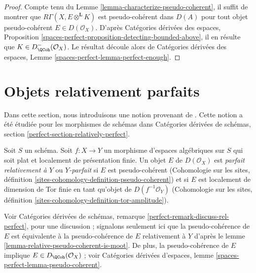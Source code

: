 \begin{proof}
Compte tenu du Lemme \ref{lemma-characterize-pseudo-coherent}, il suffit
de montrer que $R \Gamma (X, E \otimes ^{\mathbf{L}} K)$ est
pseudo-cohérent dans $D(A)$ pour tout objet pseudo-cohérent
$E \in D(\mathcal{O}_X)$. D'après Catégories dérivées des espaces,
Proposition \ref{spaces-perfect-proposition-detecting-bounded-above},
il en résulte que $K \in D^-_\QCoh (\mathcal{O}_X)$. Le
résultat découle alors de Catégories dérivées des espaces, Lemme
\ref{spaces-perfect-lemma-perfect-enough}.
\end{proof}












\section{Objets relativement parfaits}
\label{section-relatively-perfect}

\noindent
Dans cette section, nous introduisons une notion provenant de \cite{lieblich-complexes}.
Cette notion a été étudiée pour les morphismes de schémas dans
Catégories dérivées de schémas, section
\ref{perfect-section-relatively-perfect}.

\begin{definition}
\label{definition-relatively-perfect}
Soit $S$ un schéma. Soit $f : X \to Y$ un morphisme d'espaces algébriques
sur $S$ qui soit plat et localement de présentation finie.
Un objet $E$ de $D(\mathcal{O}_X)$ est {\it parfait relativement à $Y$} ou
{\it $Y$-parfait} si $E$ est pseudo-cohérent
(Cohomologie sur les sites, définition
\ref{sites-cohomology-definition-pseudo-coherent}) et si
$E$ est localement de dimension de Tor finie en tant qu'objet de
$D(f^{-1}\mathcal{O}_Y)$
(Cohomologie sur les sites, définition
\ref{sites-cohomology-definition-tor-amplitude}).
\end{definition}

\noindent
Voir Catégories dérivées de schémas,
remarque \ref{perfect-remark-discuss-rel-perfect}, pour une discussion ;
signalons seulement ici que la pseudo-cohérence de $E$ est
équivalente à la pseudo-cohérence de $E$ relativement à $Y$ d'après le
lemme \ref{lemma-relative-pseudo-coherent-is-moot}.
De plus, la pseudo-cohérence de $E$ implique $E \in D_\QCoh(\mathcal{O}_X)$ ; voir
Catégories dérivées d'espaces, lemme
\ref{spaces-perfect-lemma-pseudo-coherent}.

